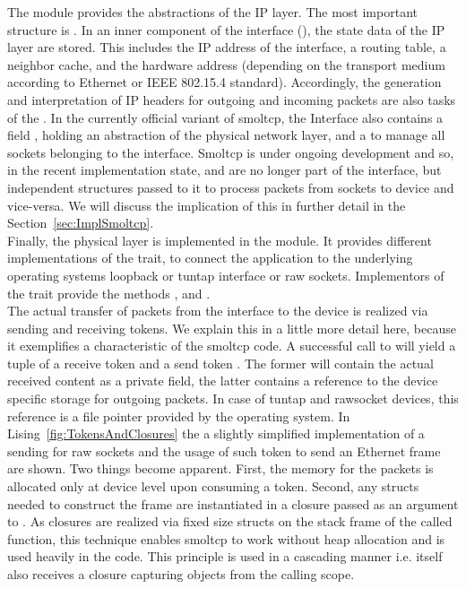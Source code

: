 The  module provides the abstractions of the IP layer. The most important structure is . In an inner component of the interface (), the state data of the IP layer are stored. This includes the IP address of the interface, a routing table, a neighbor cache, and the hardware address (depending on the transport medium according to Ethernet or IEEE 802.15.4 standard). Accordingly, the generation and interpretation of IP headers for outgoing and incoming packets are also tasks of the 
. In the currently official variant of smoltcp, the Interface also contains a field , holding an abstraction of the physical network layer, and a  to manage all sockets belonging to the interface. Smoltcp is under ongoing development and so, in the recent implementation state,  and  are no longer part of the interface, but independent structures passed to it to process packets from sockets to device and vice-versa. We will discuss the implication of this in further detail in the Section~\ref{sec:ImplSmoltcp}. \\

Finally, the physical layer is implemented in the  module. It provides different implementations of the  trait, to connect the application to the underlying operating systems loopback or tuntap interface or raw sockets. Implementors of the  trait provide the methods ,  and .\\

The actual transfer of packets from the interface to the device is realized via sending and receiving tokens. We explain this in a little more detail here, because it exemplifies a characteristic of the smoltcp code. A successful call to  will yield a tuple of a receive token  and a send token . The former will contain the actual received content as a private field, the latter contains a reference to the device specific storage for outgoing packets. In case of tuntap and rawsocket devices, this reference is a file pointer provided by the operating system. In Lising~\ref{fig:TokensAndClosures} the a slightly simplified implementation of a sending  for raw sockets and the usage of such token to send an Ethernet frame are shown. Two things become apparent. First, the memory for the packets is allocated only at device level upon consuming a token. Second, any structs needed to construct the frame are instantiated in a closure passed as an argument to . As closures are realized via fixed size structs on the stack frame of the called function, this technique enables smoltcp to work without heap allocation and is used heavily in the code. This principle is used in a cascading manner i.e.  itself also receives a closure capturing objects from the calling scope.\\

